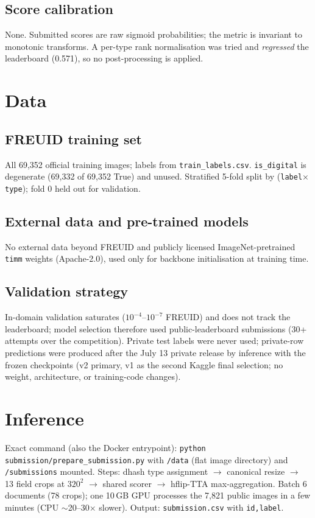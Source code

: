 \documentclass[11pt,a4paper]{article}
\begin{document}
\subsection{Score calibration}
None. Submitted scores are raw sigmoid probabilities; the metric is invariant
to monotonic transforms. A per-type rank normalisation was tried and
\emph{regressed} the leaderboard (0.571), so no post-processing is applied.

\section{Data}
\label{sec:data}

\subsection{FREUID training set}
All 69{,}352 official training images; labels from
\texttt{train\_labels.csv}. \texttt{is\_digital} is degenerate (69{,}332 of
69{,}352 True) and unused. Stratified 5-fold split by
(\texttt{label}$\times$\texttt{type}); fold 0 held out for validation.

\subsection{External data and pre-trained models}
No external data beyond FREUID and publicly licensed ImageNet-pretrained
\texttt{timm} weights (Apache-2.0), used only for backbone initialisation at
training time.

\subsection{Validation strategy}
In-domain validation saturates ($10^{-4}$--$10^{-7}$ FREUID) and does not
track the leaderboard; model selection therefore used public-leaderboard
submissions (30+ attempts over the competition).
Private test labels were never used; private-row predictions were produced
after the July 13 private release by inference with the frozen checkpoints
(v2 primary, v1 as the second Kaggle final selection; no weight, architecture,
or training-code changes).

\section{Inference}
\label{sec:inference}
Exact command (also the Docker entrypoint):
\texttt{python submission/prepare\_submission.py} with \texttt{/data} (flat
image directory) and \texttt{/submissions} mounted. Steps: dhash type
assignment $\rightarrow$ canonical resize $\rightarrow$ 13 field crops at
$320^2$ $\rightarrow$ shared scorer $\rightarrow$ hflip-TTA max-aggregation.
Batch 6 documents (78 crops); one 10\,GB GPU processes the 7{,}821 public
images in a few minutes (CPU $\sim$20--30$\times$ slower). Output:
\texttt{submission.csv} with \texttt{id,label}.
\end{document}
